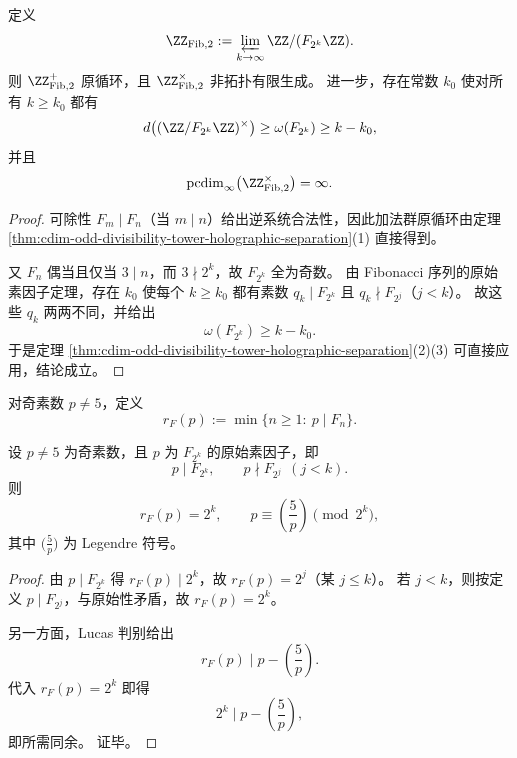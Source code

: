 \begin{corollary}\label{cor:cdim-fibonacci-2power-adic-unit-infinite}
定义
\[
\ZZ_{\mathrm{Fib},2}:=\varprojlim_{k\to\infty}\ZZ/(F_{2^k}\ZZ).
\]
则 \(\ZZ_{\mathrm{Fib},2}^{+}\) 原循环，且 \(\ZZ_{\mathrm{Fib},2}^{\times}\) 非拓扑有限生成。
进一步，存在常数 \(k_0\) 使对所有 \(k\ge k_0\) 都有
\[
d\!\left((\ZZ/F_{2^k}\ZZ)^{\times}\right)\ge \omega(F_{2^k})\ge k-k_0,
\]
并且
\[
\pcdim_{\infty}\!\left(\ZZ_{\mathrm{Fib},2}^{\times}\right)=\infty.
\]
\end{corollary}
\begin{proof}
可除性 \(F_m\mid F_n\)（当 \(m\mid n\)）给出逆系统合法性，因此加法群原循环由定理
\ref{thm:cdim-odd-divisibility-tower-holographic-separation}(1) 直接得到。
\par
又 \(F_n\) 偶当且仅当 \(3\mid n\)，而 \(3\nmid 2^k\)，故 \(F_{2^k}\) 全为奇数。
由 Fibonacci 序列的原始素因子定理，存在 \(k_0\) 使每个 \(k\ge k_0\) 都有素数
\(q_k\mid F_{2^k}\) 且 \(q_k\nmid F_{2^j}\)（\(j<k\)）。
故这些 \(q_k\) 两两不同，并给出
\[
\omega(F_{2^k})\ge k-k_0.
\]
于是定理 \ref{thm:cdim-odd-divisibility-tower-holographic-separation}(2)(3) 可直接应用，结论成立。
\end{proof}

\begin{definition}\label{def:cdim-fibonacci-rank-of-apparition}
对奇素数 \(p\neq 5\)，定义
\[
r_F(p):=\min\{n\ge 1:\ p\mid F_n\}.
\]
\end{definition}

\begin{theorem}\label{thm:cdim-fibonacci-primitive-prime-2adic-congruence}
设 \(p\neq 5\) 为奇素数，且 \(p\) 为 \(F_{2^k}\) 的原始素因子，即
\[
p\mid F_{2^k},
\qquad
p\nmid F_{2^j}\ \ (j<k).
\]
则
\[
r_F(p)=2^k,
\qquad
p\equiv\left(\frac{5}{p}\right)\pmod{2^k},
\]
其中 \(\bigl(\frac{5}{p}\bigr)\) 为 Legendre 符号。
\end{theorem}
\begin{proof}
由 \(p\mid F_{2^k}\) 得 \(r_F(p)\mid 2^k\)，故 \(r_F(p)=2^j\)（某 \(j\le k\)）。
若 \(j<k\)，则按定义 \(p\mid F_{2^j}\)，与原始性矛盾，故 \(r_F(p)=2^k\)。
\par
另一方面，Lucas 判别给出
\[
r_F(p)\mid p-\left(\frac{5}{p}\right).
\]
代入 \(r_F(p)=2^k\) 即得
\[
2^k\mid p-\left(\frac{5}{p}\right),
\]
即所需同余。
证毕。
\end{proof}

